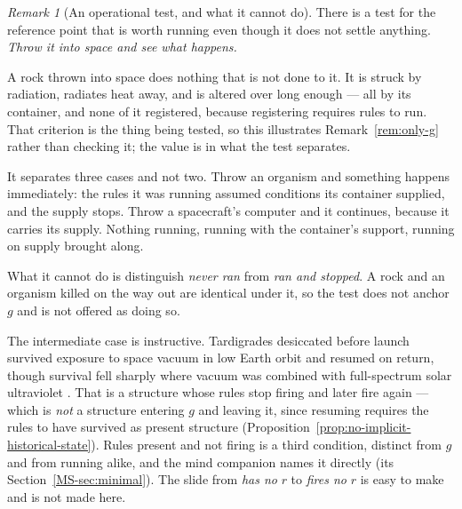 \documentclass[11pt,a4paper]{article}
\theoremstyle{remark}\newtheorem{remark}[definition]{Remark}
\begin{document}
\begin{remark}[An operational test, and what it cannot do]\label{rem:space-test}
There is a test for the reference point that is worth running even though it does not settle
anything. \emph{Throw it into space and see what happens.}

A rock thrown into space does nothing that is not done to it. It is struck by radiation, radiates
heat away, and is altered over long enough --- all by its container, and none of it registered,
because registering requires rules to run. That criterion is the thing being tested, so this
illustrates Remark~\ref{rem:only-g} rather than checking it; the value is in what the test separates.

It separates three cases and not two. Throw an organism and something happens immediately: the rules
it was running assumed conditions its container supplied, and the supply stops. Throw a spacecraft's
computer and it continues, because it carries its supply. Nothing running, running with the
container's support, running on supply brought along.

What it cannot do is distinguish \emph{never ran} from \emph{ran and stopped}. A rock and an organism
killed on the way out are identical under it, so the test does not anchor $g$ and is not offered as
doing so.

The intermediate case is instructive. Tardigrades desiccated before launch survived exposure to space vacuum in low Earth orbit and resumed
on return, though survival fell sharply where vacuum was combined with full-spectrum solar
ultraviolet \citep{jonsson2008}. That is a structure whose rules stop firing and later fire again ---
which is \emph{not} a structure entering $g$ and leaving it, since resuming requires the rules to
have survived as present structure (Proposition~\ref{prop:no-implicit-historical-state}). Rules
present and not firing is a third condition, distinct from $g$ and from running alike, and the
mind companion names it directly (its Section~\ref{MS-sec:minimal}). The slide from \emph{has no} $r$ to \emph{fires no} $r$ is easy to make and is not made here.
\end{remark}
\end{document}
